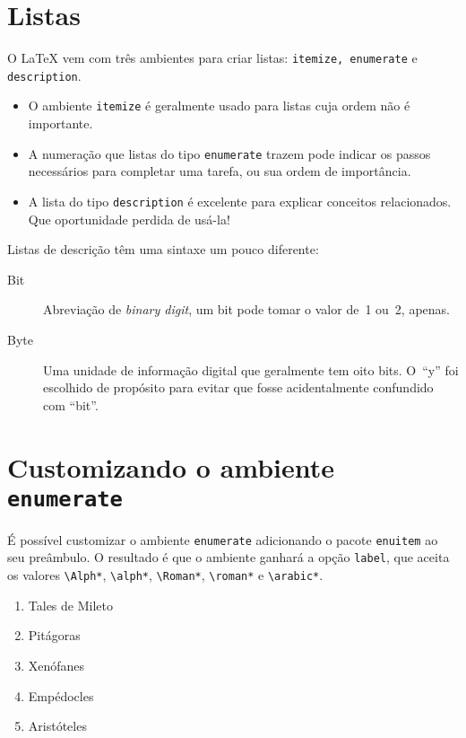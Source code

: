 \documentclass[a4paper,oneside]{article}
\begin{document}
\frenchspacing

\section{Listas}

O \LaTeX{} vem com três ambientes para criar listas: \texttt{itemize, enumerate}
e \texttt{description}.

\begin{itemize}
  \item O ambiente \texttt{itemize} é geralmente usado para listas cuja ordem
    não é importante.
  \item A numeração que listas do tipo \texttt{enumerate} trazem pode indicar
    os passos necessários para completar uma tarefa, ou sua ordem de
    importância.
  \item A lista do tipo \texttt{description} é excelente para explicar
    conceitos relacionados. Que oportunidade perdida de usá-la!
\end{itemize}

Listas de descrição têm uma sintaxe um pouco diferente:

\begin{description}
  \item[Bit] Abreviação de \emph{binary digit}, um bit pode tomar o valor de~1
    ou~2, apenas.
  \item[Byte] Uma unidade de informação digital que geralmente tem oito bits.
    O~“y” foi escolhido de propósito para evitar que fosse acidentalmente
    confundido com “bit”.
\end{description}

\section{Customizando o ambiente \texttt{enumerate}}

É possível customizar o ambiente \texttt{enumerate} adicionando o pacote
\texttt{enuitem} ao seu preâmbulo. O resultado é que o ambiente ganhará a opção
\texttt{label}, que aceita os valores \verb+\Alph*+, \verb+\alph*+,
\verb+\Roman*+, \verb+\roman*+ e \verb+\arabic*+.

\begin{enumerate}[label=\Alph*)]
  \item Tales de Mileto
  \item Pitágoras
  \item Xenófanes
  \item Empédocles
  \item Aristóteles
\end{enumerate}
\end{document}
